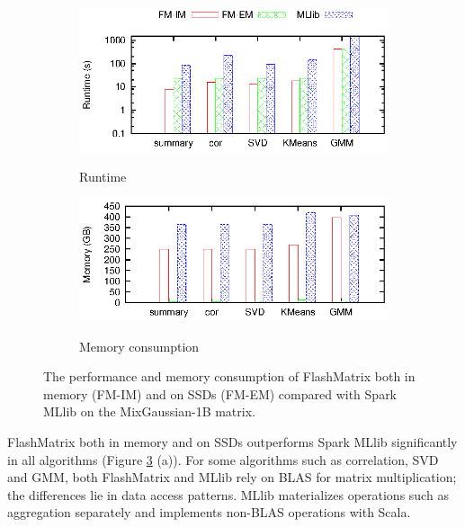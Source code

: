 \begin{figure}
	\centering
	\footnotesize
	\begin{subfigure}{.5\textwidth}
		\includegraphics{FlashMatrix_figs/FM-vs-spark.eps}
		\label{perf:rt}
		\vspace{-10pt}
		\caption{Runtime}
	\end{subfigure}

	\vspace{5pt}
	\begin{subfigure}{.5\textwidth}
		\includegraphics{FlashMatrix_figs/FM-vs-spark-mem.eps}
		\label{perf:mem}
		\vspace{-10pt}
		\caption{Memory consumption}
	\end{subfigure}
	\caption{The performance and memory consumption of FlashMatrix both
		in memory (FM-IM) and on SSDs (FM-EM) compared with Spark MLlib
		on the MixGaussian-1B matrix.}
	\label{perf:fm}
\end{figure}

FlashMatrix both in memory and on SSDs outperforms Spark MLlib significantly
in all algorithms (Figure \ref{perf:fm} (a)). For some algorithms
such as correlation, SVD and GMM, both FlashMatrix and MLlib
rely on BLAS for matrix multiplication; the differences lie in data access patterns.
MLlib materializes operations such as aggregation separately and implements
non-BLAS operations with Scala.

